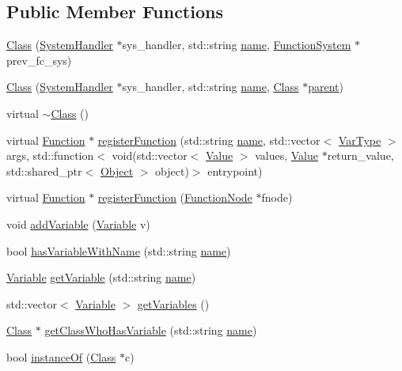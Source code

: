 \subsection*{Public Member Functions}
\begin{DoxyCompactItemize}
\item 
\hyperlink{classClass_a1c88be1af88c4c9b3c054d124ce44b6e}{Class} (\hyperlink{classSystemHandler}{System\+Handler} $\ast$sys\+\_\+handler, std\+::string \hyperlink{classClass_aac209ee2e03afc3bc9e93fd1fd46256b}{name}, \hyperlink{classFunctionSystem}{Function\+System} $\ast$prev\+\_\+fc\+\_\+sys)
\item 
\hyperlink{classClass_a1b960c202d43c46097e267e5c4e259ef}{Class} (\hyperlink{classSystemHandler}{System\+Handler} $\ast$sys\+\_\+handler, std\+::string \hyperlink{classClass_aac209ee2e03afc3bc9e93fd1fd46256b}{name}, \hyperlink{classClass}{Class} $\ast$\hyperlink{classClass_a1f94bc39c04d18b5c4421862f8506d1d}{parent})
\item 
virtual \hyperlink{classClass_aa3b9e4e0df41778f3d26777c1eb62898}{$\sim$\+Class} ()
\item 
virtual \hyperlink{classFunction}{Function} $\ast$ \hyperlink{classClass_a91798da1986d9f12a2d40a9997849542}{register\+Function} (std\+::string \hyperlink{classClass_aac209ee2e03afc3bc9e93fd1fd46256b}{name}, std\+::vector$<$ \hyperlink{classVarType}{Var\+Type} $>$ args, std\+::function$<$ void(std\+::vector$<$ \hyperlink{classValue}{Value} $>$ values, \hyperlink{classValue}{Value} $\ast$return\+\_\+value, std\+::shared\+\_\+ptr$<$ \hyperlink{classObject}{Object} $>$ object)$>$ entrypoint)
\item 
virtual \hyperlink{classFunction}{Function} $\ast$ \hyperlink{classClass_a757c7a4cb7e9e0b5486a087b953e919e}{register\+Function} (\hyperlink{classFunctionNode}{Function\+Node} $\ast$fnode)
\item 
void \hyperlink{classClass_a0c10b6fc7440f229da43f013271c0506}{add\+Variable} (\hyperlink{classVariable}{Variable} v)
\item 
bool \hyperlink{classClass_a0c5ffb0b7e3e95dedad01b8b4e91d93b}{has\+Variable\+With\+Name} (std\+::string \hyperlink{classClass_aac209ee2e03afc3bc9e93fd1fd46256b}{name})
\item 
\hyperlink{classVariable}{Variable} \hyperlink{classClass_a5c5de4f3c1419dedc92fc3d982fc6f65}{get\+Variable} (std\+::string \hyperlink{classClass_aac209ee2e03afc3bc9e93fd1fd46256b}{name})
\item 
std\+::vector$<$ \hyperlink{classVariable}{Variable} $>$ \hyperlink{classClass_ab24282751aa8b0ba2b2c71fbd3eef7e5}{get\+Variables} ()
\item 
\hyperlink{classClass}{Class} $\ast$ \hyperlink{classClass_aec836433f28bcfb9bf013ce79f24ba23}{get\+Class\+Who\+Has\+Variable} (std\+::string \hyperlink{classClass_aac209ee2e03afc3bc9e93fd1fd46256b}{name})
\item 
bool \hyperlink{classClass_a9bbffa241c269033a12c76f85af9c5ac}{instance\+Of} (\hyperlink{classClass}{Class} $\ast$c)
\end{DoxyCompactItemize}
